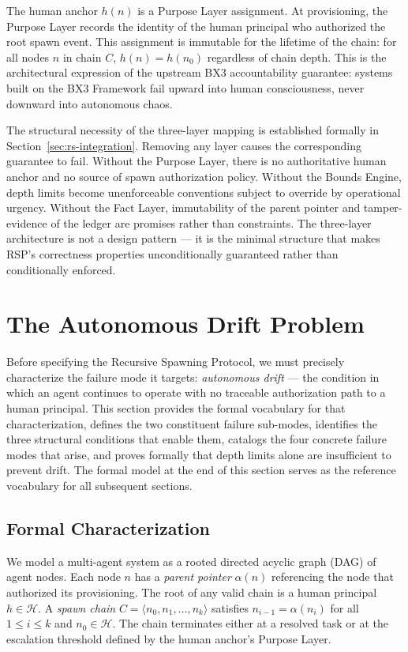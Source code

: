 \documentclass[12pt]{article}
\begin{document}
The human anchor $h(n)$ is a Purpose Layer assignment. At provisioning, the Purpose Layer records the identity of the human principal who authorized the root spawn event. This assignment is immutable for the lifetime of the chain: for all nodes $n$ in chain $C$, $h(n) = h(n_0)$ regardless of chain depth. This is the architectural expression of the upstream BX3 accountability guarantee: systems built on the BX3 Framework fail upward into human consciousness, never downward into autonomous chaos.

The structural necessity of the three-layer mapping is established formally in Section~\ref{sec:rs-integration}. Removing any layer causes the corresponding guarantee to fail. Without the Purpose Layer, there is no authoritative human anchor and no source of spawn authorization policy. Without the Bounds Engine, depth limits become unenforceable conventions subject to override by operational urgency. Without the Fact Layer, immutability of the parent pointer and tamper-evidence of the ledger are promises rather than constraints. The three-layer architecture is not a design pattern --- it is the minimal structure that makes RSP's correctness properties unconditionally guaranteed rather than conditionally enforced.
\section{The Autonomous Drift Problem}
\label{sec:drift}

Before specifying the Recursive Spawning Protocol, we must precisely characterize the failure mode it targets: \emph{autonomous drift} — the condition in which an agent continues to operate with no traceable authorization path to a human principal. This section provides the formal vocabulary for that characterization, defines the two constituent failure sub-modes, identifies the three structural conditions that enable them, catalogs the four concrete failure modes that arise, and proves formally that depth limits alone are insufficient to prevent drift. The formal model at the end of this section serves as the reference vocabulary for all subsequent sections.

\subsection{Formal Characterization}
\label{sec:drift-formal}

We model a multi-agent system as a rooted directed acyclic graph (DAG) of agent nodes. Each node $n$ has a \emph{parent pointer} $\alpha(n)$ referencing the node that authorized its provisioning. The root of any valid chain is a human principal $h \in \mathcal{H}$. A \emph{spawn chain} $C = \langle n_0, n_1, \ldots, n_k \rangle$ satisfies $n_{i-1} = \alpha(n_i)$ for all $1 \leq i \leq k$ and $n_0 \in \mathcal{H}$. The chain terminates either at a resolved task or at the escalation threshold defined by the human anchor's Purpose Layer.
\end{document}
